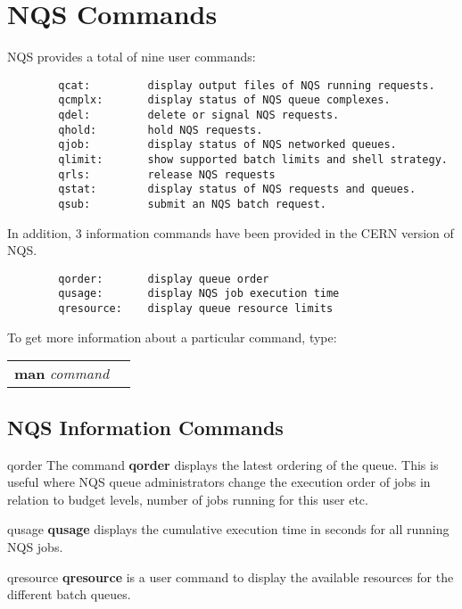 \section{NQS Commands}
 
NQS provides a total of nine user commands:
\begin{verbatim}
        qcat:         display output files of NQS running requests.
        qcmplx:       display status of NQS queue complexes.
        qdel:         delete or signal NQS requests.
        qhold:        hold NQS requests.
        qjob:         display status of NQS networked queues.
        qlimit:       show supported batch limits and shell strategy.
        qrls:         release NQS requests
        qstat:        display status of NQS requests and queues.
        qsub:         submit an NQS batch request.
\end{verbatim}
 
In addition, 3 information commands have been provided in the
CERN version of NQS.
 
\begin{verbatim}
        qorder:       display queue order
        qusage:       display NQS job execution time
        qresource:    display queue resource limits
\end{verbatim}
 
To get more information about a particular command, type:
\begin{center}
\begin{tabular}{ll}
{\bf man } {\it command}
\end{tabular}
\end{center}
 
\subsection{NQS Information Commands}
 
\begin{Lentry}
\item[qorder]
The command {\bf qorder} displays the latest ordering of the queue.
This is useful where NQS queue administrators change the execution order
of jobs in relation to budget levels, number of jobs running for this user etc.
\item[qusage]
{\bf qusage} displays the  cumulative execution time in seconds for all
running NQS jobs.
\item[qresource]
{\bf qresource} is a user command to display the available resources for
the different batch queues.
\end{Lentry}
 
